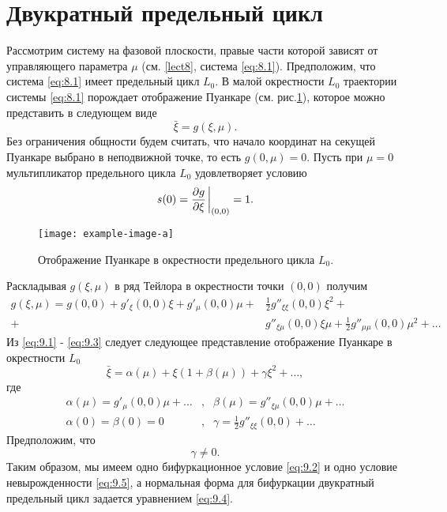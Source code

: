 
\section{Двукратный предельный цикл}%
\label{sec:9.1}

Рассмотрим систему на фазовой плоскости, правые части которой зависят от управляющего параметра $\mu$ (см. \ref{lect8}, система \eqref{eq:8.1}). Предположим, что система \eqref{eq:8.1} имеет предельный цикл $L_0$. В малой окрестности $L_0$ траектории системы \eqref{eq:8.1} порождает отображение Пуанкаре
(см. рис.\ref{fig:9.1}), которое можно представить в следующем виде
\begin{equation}
        \label{eq:9.1}
        \bar \xi = g(\xi,\mu).
\end{equation}
Без ограничения общности будем считать, что начало координат на секущей
Пуанкаре выбрано в неподвижной точке, то есть $g(0,\mu)=0$. Пусть при $\mu=0$
мультипликатор предельного цикла $L_0$ удовлетворяет условию
\begin{equation}
        \label{eq:9.2}
        s(0) = \pdv{g}{\xi} \eval_{(0,0)} = 1.
\end{equation}
\begin{figure}[h]
        \centering
        \texttt{[image: example-image-a]}
        \caption{Отображение Пуанкаре в окрестности предельного цикла $L_0$.}
        \label{fig:9.1}
\end{figure}
Раскладывая $g(\xi,\mu)$ в ряд Тейлора в окрестности точки $(0,0)$ получим
\begin{align}
        \label{eq:9.3}
        g(\xi,\mu) = g(0,0) + g'_{\xi}(0,0) \xi + g'_{\mu}(0,0) \mu 
        + &\frac{1}{2}g''_{\xi\xi}(0,0) \xi^2+ \\
        + &g''_{\xi\mu}(0,0) \xi \mu + \frac{1}{2} g''_{\mu\mu}(0,0)\mu^2+ \dots
\end{align}
Из \eqref{eq:9.1} - \eqref{eq:9.3} следует следующее представление отображение Пуанкаре в окрестности $L_0$ 
\begin{equation}
        \label{eq:9.4}
        \bar \xi = \alpha(\mu) + \xi( 1+ \beta(\mu)) + \gamma \xi^2 + \dots,
\end{equation}
где
\begin{align}
        \label{eq:}
        \alpha(\mu) = g'_{\mu}(0,0)\mu+\dots &, &\beta(\mu) = g''_{\xi\mu}(0,0) \mu + \dots \\
        \alpha(0) = \beta(0) = 0 &, &\gamma= \frac{1}{2} g''_{\xi\xi}(0,0)+ \dots
\end{align}
Предположим, что
\begin{equation}
        \label{eq:9.5}
        \gamma \neq 0.
\end{equation}
Таким образом, мы имеем одно бифуркационное условие \eqref{eq:9.2} и одно условие невырожденности
\eqref{eq:9.5}, а нормальная форма для бифуркации двукратный предельный цикл задается уравнением \eqref{eq:9.4}.

